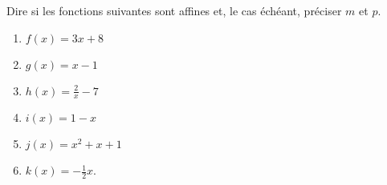 
\begin{exercice}\label{exosmath-0149}

    Dire si les fonctions suivantes sont affines et, le cas échéant, préciser \( m\) et \( p\).
    \begin{multicols}{2}
        \begin{enumerate}
            \item
                \( f(x)=3x+8\)
            \item
                \( g(x)=x-1\)
            \item
                \( h(x)=\frac{ 2 }{ x }-7\)
            \item
                \( i(x)=1-x\)
            \item
                \( j(x)=x^2+x+1\)
            \item
                \( k(x)=-\frac{ 1 }{2}x\).
        \end{enumerate}
    \end{multicols}

\end{exercice}
